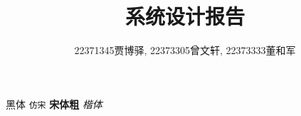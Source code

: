 \documentclass{article}
\title{系统设计报告}
\author{22371345贾博驿, 22373305曾文轩, 22373333董和军}
\date{\DTMnow}
\begin{document}
    \maketitle
    
    \textsf{黑体}   %
    \texttt{仿宋}   %
    \textbf{宋体粗} %
    \textit{楷体}   %

    
    
    
\end{document}
